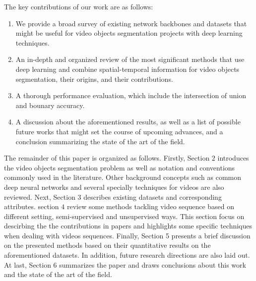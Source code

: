 The key contributions of our work are as follows:
\begin{enumerate}
    \item  We provide a broad survey of existing network backbones and datasets that might be useful for video objects segmentation projects with deep learning techniques.
    \item  An in-depth and organized review of the most signiﬁcant methods that use deep learning and combine spatial-temporal information for video objects segmentation, 
           their origins, and their contributions.
    \item  A thorough performance evaluation, which include the intersection of union and bounary accuracy.
    \item  A discussion about the aforementioned results, as well as a list of possible future works that might set the course of upcoming advances,
           and a conclusion summarizing the state of the art of the ﬁeld.
    
\end{enumerate}

The remainder of this paper is organized as follows. Firstly, Section $2$ introduces the video objects segmentation problem as well as notation and conventions commonly used in the literature.
Other background concepts such as common deep neural networks and several specially techniques for videos are also reviewed. Next, Section 3 describes existing datasets and corresponding attributes.
section $4$ review some methods tackling video sequence based on different setting, semi-supervised and unsupervised ways. This section focus on descirbing the the contributions in papers and highlights some
specific techniques when dealing with videos sequences. Finally, Section 5 presents a brief discussion on the presented methods based on their quantitative results on the aforementioned datasets. 
In addition, future research directions are also laid out. At last, Section 6 summarizes the paper and draws conclusions about this work and the state of the art of the ﬁeld.